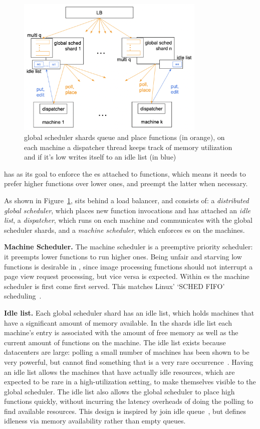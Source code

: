 \begin{figure}[t]
    \centering
      \includegraphics[width=9cm]{img/overview.png}
      \caption{ global scheduler shards queue and place functions (in orange), 
      on each machine a dispatcher thread keeps track of memory utilization 
      and if it's low writes itself to an idle list (in blue) }
    \label{fig:overview}
\end{figure}



\Sys{} has as its goal to enforce the \class{}es attached to functions, which
means it needs to prefer higher \class{} functions over lower ones, and preempt
the latter when necessary.
  

As shown in Figure~\ref{fig:overview}, \sys{} sits behind a load balancer, and
consists of: a \textit{distributed global scheduler}, which places new function
invocations and has attached an \textit{idle list}, a \textit{dispatcher},
which runs on each machine and communicates with the global scheduler shards,
and a \textit{machine scheduler}, which enforces \class{}es on the machines.


\textbf{Machine Scheduler.}
The machine scheduler is a preemptive priority scheduler: it preempts lower
\class{} functions to run higher \class{} ones. Being unfair and starving low
\class{} functions is desirable in \sys{}, since image processing functions
should not interrupt a page view request processing, but vice versa is expected.
Within \class{}es the machine scheduler is first come first served. This matches
Linux' `SCHED FIFO' scheduling~\cite{linux-sched}.


\textbf{Idle list.}
Each global scheduler shard has an idle list, which holds machines that have a
significant amount of memory available. In the shards idle list each machine's
entry is associated with the amount of free memory as well as the current amount
of functions on the machine. The idle list exists because datacenters are large:
polling a small number of machines has been shown to be very powerful, but
cannot find something that is a very rare occurrence~\cite{join-idle-queue}.
Having an idle list allows the machines that have actually idle resources, which
are expected to be rare in a high-utilization setting, to make themselves
visible to the global scheduler. The idle list also allows the global scheduler
to place high \class{} functions quickly, without incurring the latency
overheads of doing the polling to find available resources. This design is
inspired by join idle queue~\cite{join-idle-queue}, but defines idleness via
memory availability rather than empty queues.


